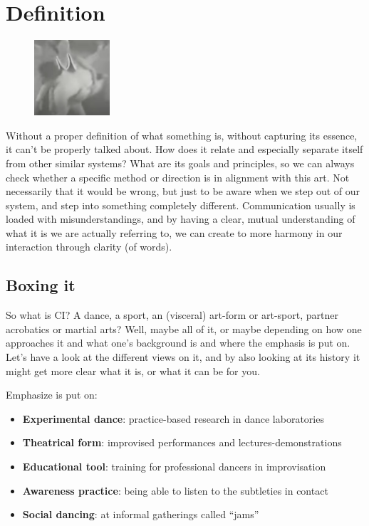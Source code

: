 \section{Definition}\label{sec:definition}

\begin{figure}
\centering
\includegraphics[width=0.25\textwidth]{images/definition}
\end{figure}

Without a proper definition of what something is, without capturing its essence, it can't be properly talked about.
How does it relate and especially separate itself from other similar systems?
What are its goals and principles, so we can always check whether a specific method or direction is in alignment with this art.
Not necessarily that it would be wrong, but just to be aware when we step out of our system, and step into something completely different.
Communication usually is loaded with misunderstandings, and by having a clear, mutual understanding of what it is we are actually referring to, we can create to more harmony in our interaction through clarity (of words).

\subsection{Boxing it}\label{subsec:boxing-it}

So what is CI? A dance, a sport, an (visceral) art-form or art-sport, partner acrobatics or martial arts?
Well, maybe all of it, or maybe depending on how one approaches it and what one's background is and where the emphasis is put on.
Let's have a look at the different views on it, and by also looking at its history it might get more clear what it is, or what it can be for you.

Emphasize is put on:
\begin{itemize}
	\item \textbf{Experimental dance}: practice-based research in dance laboratories
	\item \textbf{Theatrical form}: improvised performances and lectures-demonstrations
	\item \textbf{Educational tool}: training for professional dancers in improvisation
	\item \textbf{Awareness practice}: being able to listen to the subtleties in contact
	\item \textbf{Social dancing}: at informal gatherings called ``jams''
\end{itemize}

